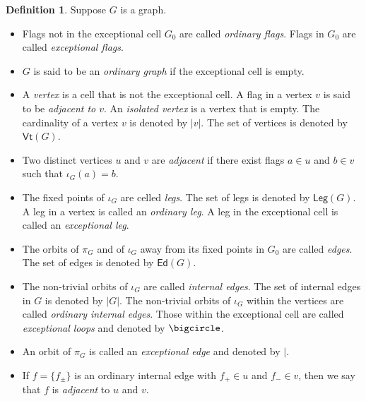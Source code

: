 \documentclass{amsbook}
\numberwithin{section}{chapter}
\numberwithin{subsection}{section}
\numberwithin{equation}{section}
\theoremstyle{plain}
\theoremstyle{definition}
\newtheorem{definition}[equation]{Definition}
\newcommand{\edge}{\vert}
\newcommand{\Ed}{\mathsf{Ed}}
\newcommand{\Leg}{\mathsf{Leg}}
\newcommand{\Vt}{\mathsf{Vt}}
\begin{document}
\begin{definition}\label{def:graph-terminology} Suppose $G$ is a graph.
\begin{itemize}
\item Flags not in the exceptional cell $G_0$ are called \emph{ordinary flags}.  Flags in $G_0$ are called \emph{exceptional flags}.
\item $G$ is said to be an \emph{ordinary graph} if the exceptional cell is empty.
\item A \emph{vertex} is a cell that is not the exceptional cell.  A flag in a vertex $v$ is said to be \emph{adjacent to $v$}.  An \emph{isolated vertex} is a vertex that is empty.  The cardinality of a vertex $v$ is denoted by $|v|$.\label{notation:vertex}  The set of vertices is denoted by $\Vt(G)$.
\item Two distinct vertices $u$ and $v$ are \emph{adjacent} if there exist flags $a \in u$ and $b \in v$ such that $\iota_G(a) = b$.
\item The fixed points of $\iota_G$ are celled \emph{legs}.  The set of legs is denoted by $\Leg(G)$.\label{notation:leg}  A leg in a vertex is called an \emph{ordinary leg}.  A leg in the exceptional cell is called an \emph{exceptional leg}.
\item The orbits of $\pi_G$ and of $\iota_G$ away from its fixed points in $G_0$ are called \emph{edges}.  The set of edges is denoted by $\Ed(G)$.\label{notation:edge}
\item The non-trivial orbits of $\iota_G$ are called \emph{internal edges}.  The set of internal edges in $G$ is denoted by $|G|$.  The non-trivial orbits of $\iota_G$ within the vertices are called \emph{ordinary internal edges}.  Those within the exceptional cell are called \emph{exceptional loops} and denoted by \label{notation:exceptional-loop}$\bigcircle$. 
\item An orbit of $\pi_G$ is called an \emph{exceptional edge} and denoted by $\edge$.
\item If $f=\{f_{\pm}\}$ is an ordinary internal edge with $f_+ \in u$ and $f_- \in v$, then we say that $f$ is \emph{adjacent} to $u$ and $v$.
\end{itemize}\end{definition}
\end{document}
